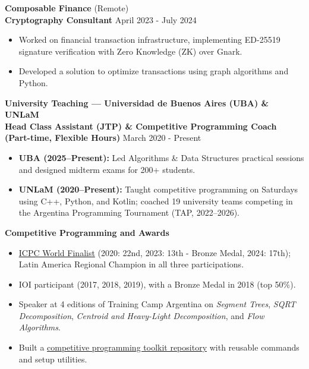 \documentclass[10pt]{article}
\begin{document}
\vspace{2pt}
\textbf{Composable Finance} \hfill (Remote)\\
\textbf{Cryptography Consultant} \hfill April 2023 - July 2024
\begin{itemize}[noitemsep, topsep=0pt, partopsep=0pt, parsep=0pt]
    \item Worked on financial transaction infrastructure, implementing ED-25519 signature verification with Zero Knowledge (ZK) over Gnark.
    \item Developed a solution to optimize transactions using graph algorithms and Python.
\end{itemize}
\vspace{2pt}
\textbf{University Teaching --- Universidad de Buenos Aires (UBA) \& UNLaM}\\
\textbf{Head Class Assistant (JTP) \& Competitive Programming Coach (Part-time, Flexible Hours)} \hfill March 2020 - Present
\begin{itemize}[noitemsep, topsep=0pt, partopsep=0pt, parsep=0pt]
    \item \textbf{UBA (2025--Present):} Led Algorithms \& Data Structures practical sessions and designed midterm exams for 200+ students.
    \item \textbf{UNLaM (2020--Present):} Taught competitive programming on Saturdays using C++, Python, and Kotlin; coached 19 university teams competing in the Argentina Programming Tournament (TAP, 2022--2026).
\end{itemize}

\vspace{-2pt}
\begin{center}
    \textbf{Competitive Programming and Awards}
\end{center}
\vspace{-2pt}
\begin{itemize}[noitemsep, topsep=0pt, partopsep=0pt, parsep=0pt]
    \item \href{https://icpc.global/ICPCID/DV1XEVUDPG8J}{ICPC World Finalist} (2020: 22nd, 2023: 13th - Bronze Medal, 2024: 17th); Latin America Regional Champion in all three participations.
    \item IOI participant (2017, 2018, 2019), with a Bronze Medal in 2018 (top 50\%).
    \item Speaker at 4 editions of Training Camp Argentina on \textit{Segment Trees}, \textit{SQRT Decomposition}, \textit{Centroid and Heavy-Light Decomposition}, and \textit{Flow Algorithms}.
    \item Built a \href{https://github.com/LautaroLasorsa/competitive-programming-suite}{competitive programming toolkit repository} with reusable commands and setup utilities.
\end{itemize}
\end{document}
